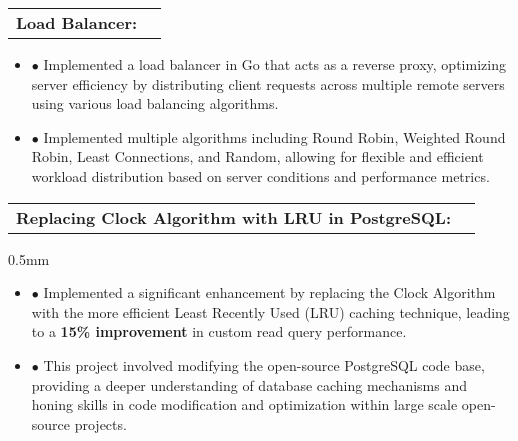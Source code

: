 \documentclass[letterpaper,11pt]{article}
\makeatletter
\newcommand{\resumeProject}[2]{
\vspace{0mm}\item[]
    \begin{tabular*}{\textwidth}[t]{l@{\extracolsep{\fill}}r}
        \hspace{-4.4mm} \small\textbf{#1} & 
        \hspace{-4.3mm} \footnotesize{\text{#2}} 
    \end{tabular*}
    \vspace{-9.0mm}
}
\newcommand{\resumeItemListStart}{\begin{justify}\begin{itemize}[leftmargin=3ex, rightmargin=2ex, noitemsep,labelsep=1.2mm,itemsep=0mm]\small}
\newcommand{\resumeItemListEnd}{\end{itemize}\end{justify}\vspace{-1.5mm}}
\makeatother
\begin{document}
\resumeProject
{\normalfont \textbf{Load Balancer: } \raisebox{}{\href{https://github.com/sudhamshreddy7/Load-Balancer}{\color{blue}\underline{[GitHub]}}}}
{} %
\vspace{0.5mm}
\resumeItemListStart
\normalfont \item[$\bullet$] Implemented a load balancer in Go that acts as a reverse proxy, optimizing server efficiency by distributing client requests across multiple remote servers using various load balancing algorithms.
\normalfont \item[$\bullet$] Implemented multiple algorithms including Round Robin, Weighted Round Robin, Least Connections, and Random, allowing for flexible and efficient workload distribution based on server conditions and performance metrics.
\resumeItemListEnd

\resumeProject
{\normalfont \textbf{Replacing Clock Algorithm with LRU in PostgreSQL:} \raisebox{}{\href{https://github.com/sudhamshreddy7/PostgreSQL}{\color{blue}\underline{[GitHub]}}}}

\vspace{0.5mm}
\resumeItemListStart
\normalfont \item[$\bullet$] Implemented a significant enhancement by replacing the Clock Algorithm with the more efficient Least Recently Used (LRU) caching technique, leading to a \textbf{15\% improvement} in custom read query performance.
\normalfont \item[$\bullet$] This project involved modifying the open-source PostgreSQL code base, providing a deeper understanding of database caching mechanisms and honing skills in code modification and optimization within large scale open-source projects.
\resumeItemListEnd


  
\end{document}
